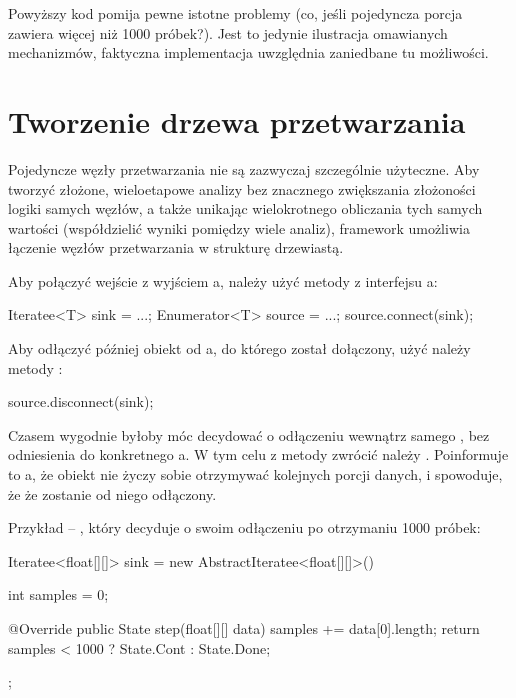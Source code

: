 \begin{Note}
Powyższy kod pomija pewne istotne problemy (co, jeśli pojedyncza porcja zawiera więcej niż 1000
próbek?). Jest to jedynie ilustracja omawianych mechanizmów, faktyczna implementacja uwzględnia
zaniedbane tu możliwości.
\end{Note}


\section{Tworzenie drzewa przetwarzania}

Pojedyncze węzły przetwarzania nie są zazwyczaj szczególnie użyteczne. Aby tworzyć złożone,
wieloetapowe analizy bez znacznego zwiększania złożoności logiki samych węzłów, a także unikając
wielokrotnego obliczania tych samych wartości (współdzielić wyniki pomiędzy wiele analiz), framework
umożliwia łączenie węzłów przetwarzania w strukturę drzewiastą.

Aby połączyć wejście  z wyjściem a, należy użyć metody
 z interfejsu a:

\begin{java}
Iteratee<T> sink = ...;
Enumerator<T> source = ...;
source.connect(sink);
\end{java}

Aby odłączyć później obiekt  od a, do którego został dołączony, użyć
należy metody :

\begin{java}
source.disconnect(sink);
\end{java}

Czasem wygodnie byłoby móc decydować o odłączeniu wewnątrz samego , bez odniesienia
do konkretnego a. W tym celu z metody  zwrócić należy .
Poinformuje to a, że obiekt nie życzy sobie otrzymywać kolejnych porcji danych, i
spowoduje, że że zostanie od niego odłączony.

Przykład -- , który decyduje o swoim odłączeniu po otrzymaniu 1000 próbek:

\begin{java}
Iteratee<float[][]> sink = new AbstractIteratee<float[][]>() {

    int samples = 0;

    @Override
    public State step(float[][] data) {
        samples += data[0].length;
        return samples < 1000 ? State.Cont : State.Done;
    }
};
\end{java}


